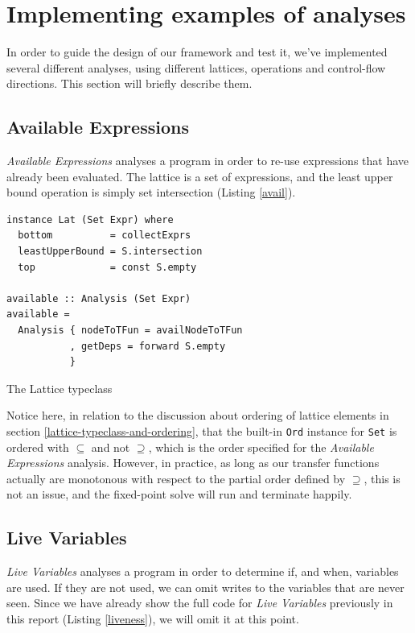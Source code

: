 \documentclass{article}
\begin{document}
\section{Implementing examples of
analyses}\label{implementing-examples-of-analyses}

In order to guide the design of our framework and test it, we've
implemented several different analyses, using different lattices,
operations and control-flow directions. This section will briefly
describe them.

\subsection{Available Expressions}\label{available-expressions}

\emph{Available Expressions} analyses a program in order to
re-use expressions that have already been evaluated. The lattice is a
set of expressions, and the least upper bound operation is simply set
intersection (Listing \ref{avail}).

\begin{listing}[H]
\begin{verbatim}
instance Lat (Set Expr) where
  bottom          = collectExprs
  leastUpperBound = S.intersection
  top             = const S.empty

available :: Analysis (Set Expr)
available =
  Analysis { nodeToTFun = availNodeToTFun
           , getDeps = forward S.empty
           }
\end{verbatim}
\caption{The Lattice typeclass}
\label{avail}
\end{listing}

Notice here, in relation to the discussion about ordering of lattice
elements in section \ref{lattice-typeclass-and-ordering}, that the built-in \texttt{Ord} instance for \texttt{Set} is
ordered with $⊆$ and not $⊇$, which is the order specified for the
\emph{Available Expressions} analysis. However, in practice, as long as
our transfer functions actually are monotonous with respect to the
partial order defined by $⊇$, this is not an issue, and the fixed-point solve
will run and terminate happily.

\subsection{Live Variables}\label{live-variables}

\emph{Live Variables} analyses a program in order to
determine if, and when, variables are used. If they are not used, we can omit
writes to the variables that are never seen. Since we have already show
the full code for \emph{Live Variables} previously in this
report (Listing \ref{liveness}), we will omit it at this point.
\end{document}
